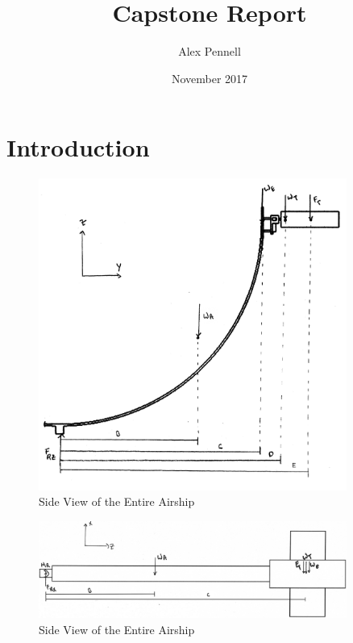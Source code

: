 \documentclass[12pt]{article}
\title{Capstone Report}
\author{Alex Pennell}
\date{November 2017}
\begin{document}
\maketitle

\section{Introduction}

\begin{figure}
	\centering
	\includegraphics[width=0.9\textwidth]{Thruster/ArmThrustDonwards.png}
	\caption{Side View of the Entire Airship}
	\label{fig:ArmThrust}
\end{figure}

\begin{figure}
	\centering
	\includegraphics[width=0.9\textwidth]{Thruster/ArmDown.png}
	\caption{Side View of the Entire Airship}
	\label{fig:ArmDown}
\end{figure}
\end{document}
